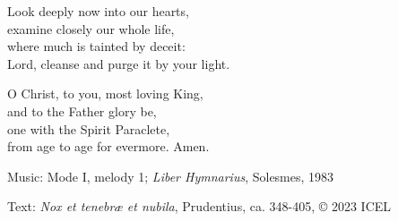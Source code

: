\hymn



\begin{underhymnverse}
Look deeply now into our hearts,\\
examine closely our whole life,\\
where much is tainted by deceit:\\
Lord, cleanse and purge it by your light.

O Christ, to you, most loving King,\\
and to the Father glory be,\\
one with the Spirit Paraclete,\\
from age to age for evermore. Amen.
\end{underhymnverse}

\begin{hymnsource}
Music: Mode I, melody 1; \emph{Liber Hymnarius}, Solesmes, 1983

Text: \emph{Nox et tenebræ et nubila}, Prudentius, ca. 348-405, © 2023 ICEL
\end{hymnsource}
